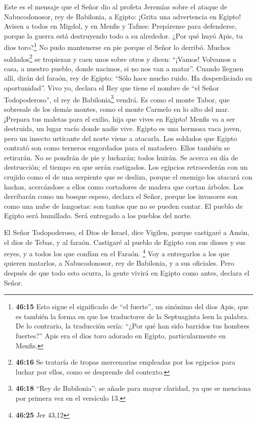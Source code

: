  Este es el mensaje que el Señor dio al profeta Jeremías
sobre el ataque de Nabucodonosor, rey de Babilonia, a Egipto:
 ¡Grita una advertencia en Egipto! Avisen a todos en
Migdol, y en Menfis y Tafnes: Prepárense para defenderse, porque la
guerra está destruyendo todo a su alrededor.  ¿Por qué
huyó Apis, tu dios toro?\footnote{\textbf{46:15} Esto sigue el
  significado de ``el fuerte'', un sinónimo del dios Apis, que es
  también la forma en que los traductores de la Septuaginta leen la
  palabra. De lo contrario, la traducción sería: ``¿Por qué han sido
  barridos tus hombres fuertes?'' Apis era el dios toro adorado en
  Egipto, particularmente en Menfis.} No pudo mantenerse en pie porque
el Señor lo derribó.  Muchos soldados\footnote{\textbf{46:16}
  Se trataría de tropas mercenarias empleadas por los egipcios para
  luchar por ellos, como se desprende del contexto.} se tropiezan y caen
unos sobre otros y dicen: ``¡Vamos! Volvamos a casa, a nuestro pueblo,
donde nacimos, si no nos van a matar''.  Cuando lleguen
allí, dirán del faraón, rey de Egipto: ``Sólo hace mucho ruido. Ha
desperdiciado su oportunidad''.  Vivo yo, declara el Rey
que tiene el nombre de ``el Señor Todopoderoso'', el rey de
Babilonia\footnote{\textbf{46:18} ``Rey de Babilonia'': se añade para
  mayor claridad, ya que se menciona por primera vez en el versículo 13.}
vendrá. Es como el monte Tabor, que sobresale de los demás montes, como
el monte Carmelo en lo alto del mar.  ¡Prepara tus
maletas para el exilio, hija que vives en Egipto! Menfis va a ser
destruida, un lugar vacío donde nadie vive.  Egipto es
una hermosa vaca joven, pero un insecto urticante del norte viene a
atacarla.  Los soldados que Egipto contrató son como
terneros engordados para el matadero. Ellos también se retirarán. No se
pondrán de pie y lucharán; todos huirán. Se acerca su día de
destrucción; el tiempo en que serán castigados.  Los
egipcios retrocederán con un crujido como el de una serpiente que se
desliza, porque el enemigo los atacará con hachas, acercándose a ellos
como cortadores de madera que cortan árboles.  Los
derribarán como un bosque espeso, declara el Señor, porque los invasores
son como una nube de langostas: son tantos que no se pueden contar.
 El pueblo de Egipto será humillado. Será entregado a los
pueblos del norte.

 El Señor Todopoderoso, el Dios de Israel, dice Vigilen,
porque castigaré a Amón, el dios de Tebas, y al faraón. Castigaré al
pueblo de Egipto con sus dioses y sus reyes, y a todos los que confían
en el Faraón. \footnote{\textbf{46:25} Jer 43,12}  Voy a
entregarlos a los que quieren matarlos, a Nabucodonosor, rey de
Babilonia, y a sus oficiales. Pero después de que todo esto ocurra, la
gente vivirá en Egipto como antes, declara el Señor.

